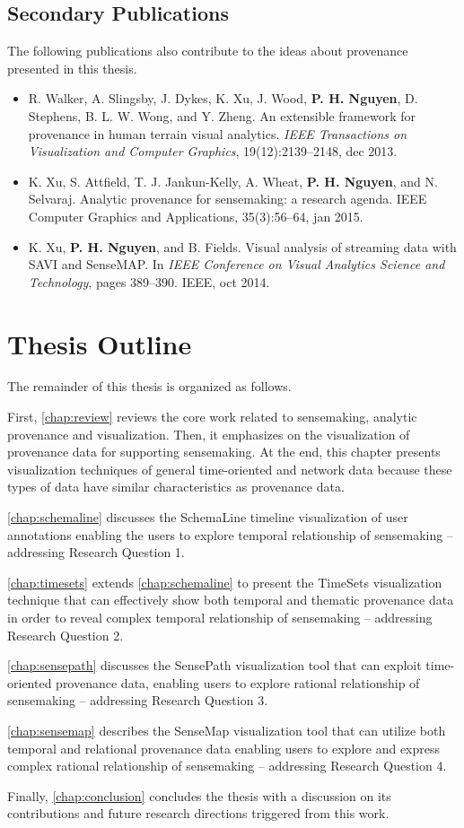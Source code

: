 \subsection{Secondary Publications} 
The following publications also contribute to the ideas about provenance presented in this thesis.

\begin{itemize}
\item R. Walker, A. Slingsby, J. Dykes, K. Xu, J. Wood, \textbf{P. H. Nguyen}, D. Stephens, B. L. W. Wong, and Y. Zheng. An extensible framework for provenance in human terrain visual analytics. \textit{IEEE Transactions on Visualization and Computer Graphics}, 19(12):2139--2148, dec 2013.
\item K. Xu, S. Attfield, T. J. Jankun-Kelly, A. Wheat, \textbf{P. H. Nguyen}, and N. Selvaraj. Analytic provenance for sensemaking: a research agenda. IEEE Computer Graphics and Applications, 35(3):56--64, jan 2015.
\item K. Xu, \textbf{P. H. Nguyen}, and B. Fields. Visual analysis of streaming data with SAVI and SenseMAP. In \textit{IEEE Conference on Visual Analytics Science and Technology}, pages 389--390. IEEE, oct 2014.
\end{itemize}

\section{Thesis Outline} 
The remainder of this thesis is organized as follows.

First, \autoref{chap:review} reviews the core work related to sensemaking, analytic provenance and visualization. Then, it emphasizes on the visualization of provenance data for supporting sensemaking. At the end, this chapter presents visualization techniques of general time-oriented and network data because these types of data have similar characteristics as provenance data.

\autoref{chap:schemaline} discusses the SchemaLine timeline visualization of user annotations enabling the users to explore temporal relationship of sensemaking -- addressing Research Question 1.

\autoref{chap:timesets} extends \autoref{chap:schemaline} to present the TimeSets visualization technique that can effectively show both temporal and thematic provenance data in order to reveal complex temporal relationship of sensemaking -- addressing Research Question 2.

\autoref{chap:sensepath} discusses the SensePath visualization tool that can exploit time-oriented provenance data, enabling users to explore rational relationship of sensemaking -- addressing Research Question 3.

\autoref{chap:sensemap} describes the SenseMap visualization tool that can utilize both temporal and relational provenance data enabling users to explore and express complex rational relationship of sensemaking -- addressing Research Question 4.

Finally, \autoref{chap:conclusion} concludes the thesis with a discussion on its contributions and future research directions triggered from this work.